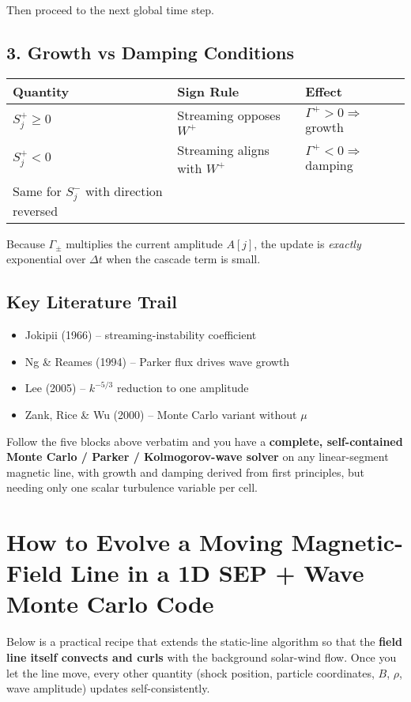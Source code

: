 Then proceed to the next global time step.

\subsection*{3. Growth vs Damping Conditions}

\begin{tabular}{|l|l|l|}
\hline
\textbf{Quantity} & \textbf{Sign Rule} & \textbf{Effect} \\
\hline
$S^+_j \geq 0$ & Streaming opposes $W^+$ & $\Gamma^+ > 0 \Rightarrow$ growth \\
$S^+_j < 0$ & Streaming aligns with $W^+$ & $\Gamma^+ < 0 \Rightarrow$ damping \\
Same for $S^-_j$ with direction reversed & & \\
\hline
\end{tabular}

\medskip

Because $\Gamma_\pm$ multiplies the current amplitude $A[j]$, the update is \textit{exactly} exponential over $\Delta t$ when the cascade term is small.

\subsection*{Key Literature Trail}

\begin{itemize}
\item Jokipii (1966) – streaming-instability coefficient
\item Ng \& Reames (1994) – Parker flux drives wave growth
\item Lee (2005) – $k^{-5/3}$ reduction to one amplitude
\item Zank, Rice \& Wu (2000) – Monte Carlo variant without $\mu$
\end{itemize}

Follow the five blocks above verbatim and you have a \textbf{complete, self-contained Monte Carlo / Parker / Kolmogorov-wave solver} on any linear-segment magnetic line, with growth and damping derived from first principles, but needing only one scalar turbulence variable per cell.

\section*{How to Evolve a \textbf{Moving Magnetic-Field Line} in a 1D SEP + Wave Monte Carlo Code}

Below is a practical recipe that extends the static-line algorithm so that the \textbf{field line itself convects and curls} with the background solar-wind flow. Once you let the line move, every other quantity (shock position, particle coordinates, $B$, $\rho$, wave amplitude) updates self-consistently.


